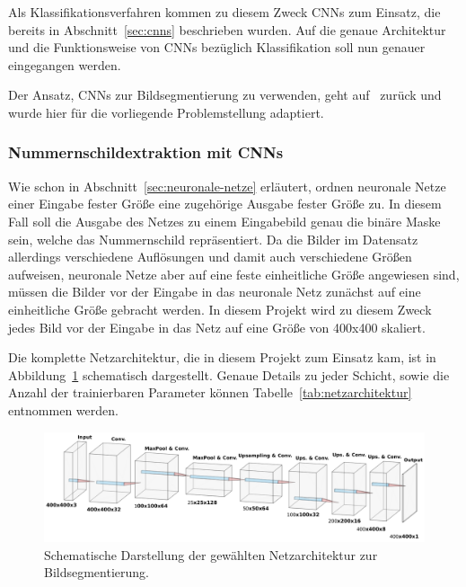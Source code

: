 Als Klassifikationsverfahren kommen zu diesem Zweck CNNs zum Einsatz,
die bereits in Abschnitt~\ref{sec:cnns} beschrieben wurden.
Auf die genaue Architektur und die Funktionsweise von CNNs bez\"uglich
Klassifikation soll nun genauer eingegangen werden.

Der Ansatz, CNNs zur Bildsegmentierung zu verwenden, geht
auf~\cite{image-segmentation} zur\"uck und wurde hier f\"ur die
vorliegende Problemstellung adaptiert.

\subsubsection{Nummernschildextraktion mit CNNs}

Wie schon in Abschnitt~\ref{sec:neuronale-netze} erl\"autert, ordnen
neuronale Netze einer Eingabe fester Gr\"o{\ss}e eine zugeh\"orige
Ausgabe fester Gr\"o{\ss}e zu.
In diesem Fall soll die Ausgabe des Netzes zu einem Eingabebild
genau die bin\"are Maske sein, welche das Nummernschild repr\"asentiert.
Da die Bilder im Datensatz allerdings verschiedene Aufl\"osungen
und damit auch verschiedene Gr\"o{\ss}en aufweisen, neuronale Netze
aber auf eine feste einheitliche Gr\"o{\ss}e angewiesen sind,
m\"ussen die Bilder vor der Eingabe in das neuronale Netz
zun\"achst auf eine einheitliche Gr\"o{\ss}e gebracht werden.
In diesem Projekt wird zu diesem Zweck jedes Bild vor der Eingabe
in das Netz auf eine Gr\"o{\ss}e von 400x400 skaliert.

Die komplette Netzarchitektur, die in diesem Projekt zum Einsatz kam,
ist in Abbildung~\ref{fig:netzarchitektur} schematisch dargestellt.
Genaue Details zu jeder Schicht, sowie die Anzahl der trainierbaren
Parameter k\"onnen Tabelle~\ref{tab:netzarchitektur} entnommen werden.

\begin{figure}[h]
    \centering
    \includegraphics[width=\textwidth]{abbildungen/network_architecture}
    \caption{Schematische Darstellung der gew\"ahlten Netzarchitektur
        zur Bildsegmentierung.}
    \label{fig:netzarchitektur}
\end{figure}

